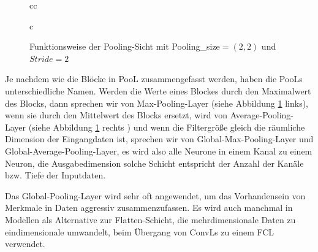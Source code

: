 \documentclass[12pt,a4paper]{scrartcl}
\numberwithin{equation}{section}
\def\Arrow{\raisebox{3\height}{\scalebox{1}{$\xRightarrow[.]{.}$}}}
\begin{document}
\begin{figure}[h]
\begin{tabular}{cc}
\begin{tabular}{c}
\Arrow
				
			\end{tabular}

		
	\end{tabular}
			\caption{Funktionsweise der Pooling-Sicht mit Pooling\_size$ =(2,2) $ und $ Stride =2$}
			\label{fig:Pooling}
\end{figure}




Je nachdem wie die Blöcke in \ac{PooL} zusammengefasst werden, haben die \acsp{PooL} unterschiedliche Namen. Werden die Werte eines Blockes durch den Maximalwert des Blocks, dann sprechen wir von Max-Pooling-Layer (siehe Abbildung \ref{fig:Pooling} links), wenn sie durch den Mittelwert  des Blocks ersetzt, wird von Average-Pooling-Layer (siehe Abbildung \ref{fig:Pooling} rechts ) und wenn die Filtergröße gleich die räumliche Dimension der Eingangdaten ist, sprechen wir von Global-Max-Pooling-Layer und Global-Average-Pooling-Layer, es wird also alle Neurone in einem Kanal zu einem Neuron, die Ausgabedimension solche Schicht entspricht der Anzahl der Kanäle bzw. Tiefe der Inputdaten.

Das Global-Pooling-Layer wird sehr oft angewendet, um das Vorhandensein von Merkmale in Daten aggressiv zusammenzufassen. Es wird auch manchmal in Modellen als Alternative zur Flatten-Schicht, die mehrdimensionale Daten zu eindimensionale umwandelt, beim Übergang von \acsp{ConvL} zu einem \ac{FCL}  verwendet.
\end{document}
